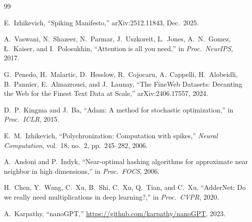 \documentclass[11pt]{article}
\begin{document}
\begin{thebibliography}{99}

E.~Izhikevich, ``Spiking Manifesto,'' arXiv:2512.11843, Dec.~2025.

A.~Vaswani, N.~Shazeer, N.~Parmar, J.~Uszkoreit, L.~Jones, A.~N.~Gomez, \L.~Kaiser, and I.~Polosukhin,
``Attention is all you need,'' in \emph{Proc.\ NeurIPS}, 2017.

G.~Penedo, H.~Malartic, D.~Hesslow, R.~Cojocaru, A.~Cappelli, H.~Alobeidli, B.~Pannier, E.~Almazrouei, and J.~Launay,
``The FineWeb Datasets: Decanting the Web for the Finest Text Data at Scale,'' arXiv:2406.17557, 2024.

D.~P.~Kingma and J.~Ba, ``Adam: A method for stochastic optimization,'' in \emph{Proc.\ ICLR}, 2015.

E.~M.~Izhikevich, ``Polychronization: Computation with spikes,'' \emph{Neural Computation}, vol.~18, no.~2, pp.~245--282, 2006.

A.~Andoni and P.~Indyk, ``Near-optimal hashing algorithms for approximate near neighbor in high dimensions,'' in \emph{Proc.\ FOCS}, 2006.

H.~Chen, Y.~Wang, C.~Xu, B.~Shi, C.~Xu, Q.~Tian, and C.~Xu,
``AdderNet: Do we really need multiplications in deep learning?,'' in \emph{Proc.\ CVPR}, 2020.

A.~Karpathy, ``nanoGPT,'' \url{https://github.com/karpathy/nanoGPT}, 2023.

\end{thebibliography}
\end{document}
